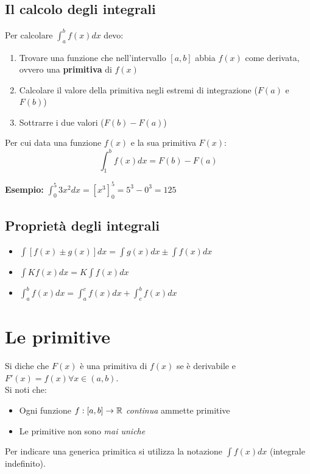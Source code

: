 \documentclass[12pt, a4paper, openany]{book}
\newcommand{\esempio}[1]{\begin{box_esempio} \textbf{Esempio: }#1\end{box_esempio}}
\begin{document}
\subsection{Il calcolo degli integrali}
Per calcolare $\int_{a}^{b} f(x) dx$ devo:
\begin{enumerate}
    \item Trovare una funzione che nell'intervallo $[a,b]$ abbia $f(x)$ come derivata, ovvero una \textbf{primitiva} di $f(x)$
    \item Calcolare il valore della primitiva negli estremi di integrazione ($F(a)$ e $F(b)$)
    \item Sottrarre i due valori ($F(b)-F(a)$)
\end{enumerate}
Per cui data una funzione $f(x)$ e la sua primitiva $F(x)$: $$\int_{1}^{b} f(x)dx = F(b)- F(a)$$

\esempio{
    $\int_{0}^{5} 3x^2 dx = [x^3]_{0}^{5} = 5^3 - 0^3 = 125$
}

\subsection{Proprietà degli integrali}
\begin{itemize}
    \item $\int[f(x) \pm g(x)] dx = \int g(x) dx \pm \int f(x) dx$
    \item $\int K f(x) dx = K\int f(x) dx$
    \item $\int_{a}^{b} f(x) dx = \int_{a}^{c} f(x) dx + \int_{c}^{b} f(x) dx$
\end{itemize}

\section{Le primitive}
Si diche che $F(x)$ è una primitiva di $f(x)$ se è derivabile e $F'(x) = f(x) \forall x\in (a,b)$.
\\Si noti che:
\begin{itemize}
    \item Ogni funzione $f:[a,b] \to \mathbb{R}$ \emph{continua} ammette primitive
    \item Le primitive non sono \emph{mai uniche}
\end{itemize}
Per indicare una generica primitica si utilizza la notazione $\int f(x) dx$ (integrale indefinito).
\end{document}
